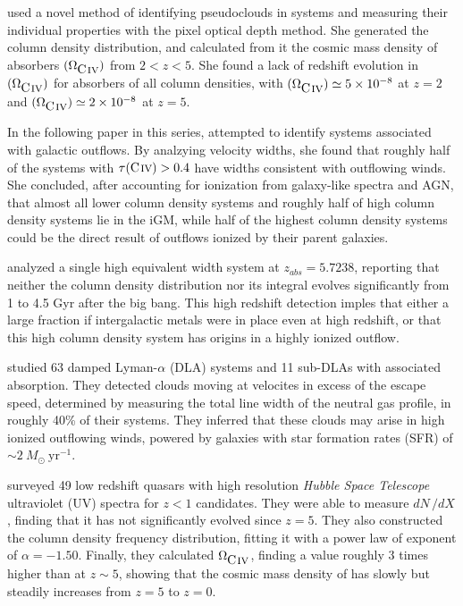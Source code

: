 \documentclass[linenumbers,twocolumn]{aastex61}
\begin{document}
\cite{Songaila2005} used a novel method of identifying pseudoclouds in {\CIVdblt} systems and measuring their individual properties with the pixel optical depth method. She generated the {\CIV} column density distribution, and calculated from it the cosmic mass density of {\CIV} absorbers $(\Omega_{\hbox{{\rm C}\kern 0.1em{\sc iv}}})$ from $2 < z < 5$. She found a lack of redshift evolution in $(\Omega_{\hbox{{\rm C}\kern 0.1em{\sc iv}}})$ for absorbers of all column densities, with $(\Omega_{\hbox{{\rm C}\kern 0.1em{\sc iv}}}) \simeq 5 \times 10^{-8}$ at $z = 2$ and $(\Omega_{\hbox{{\rm C}\kern 0.1em{\sc iv}}}) \simeq 2 \times 10^{-8}$ at $z = 5$. %

In the following paper in this series, \cite{Songaila2006} attempted to identify {\CIV} systems associated with galactic outflows. By analzying velocity widths, she found that roughly half of the systems with $\tau(\hbox{{\rm C}\kern 0.1em{\sc iv}}) > 0.4$ have widths consistent with outflowing winds. She concluded, after accounting for ionization from galaxy-like spectra and AGN, that almost all lower column density systems and roughly half of high column density {\CIV} systems lie in the iGM, while half of the highest column density systems could be the direct result of outflows ionized by their parent galaxies.

\cite{Ryan-Weber2006} analyzed a single high equivalent width {\CIV} system at $z_{abs} = 5.7238$, reporting that neither the column density distribution nor its integral evolves significantly from 1 to 4.5 Gyr after the big bang. This high redshift detection imples that either a large fraction if intergalactic metals were in place even at high redshift, or that this high column density system has origins in a highly ionized outflow.

\cite{Fox2007} studied 63 damped Lyman-$\alpha$ (DLA) systems and 11 sub-DLAs with associated {\CIV} absorption. They detected {\CIV} clouds moving at velocites in excess of the escape speed, determined by measuring the total line width of the neutral gas profile, in roughly 40\% of their systems. They inferred that these clouds may arise in high ionized outflowing winds, powered by galaxies with star formation rates (SFR) of $\sim 2~M_{\odot}~\mathrm{yr^{-1}}$.

\cite{Cooksey2010} surveyed 49 low redshift quasars with high resolution {\it Hubble Space Telescope} ultraviolet (UV) spectra for $z < 1$ {\CIV} candidates. They were able to measure $dN\,/dX$, finding that it has not significantly evolved since $z = 5$. They also constructed the column density frequency distribution, fitting it with a power law of exponent of $\alpha = -1.50$. Finally, they calculated $\Omega_{\hbox{{\rm C}\kern 0.1em{\sc iv}}}$, finding a value roughly 3 times higher than at $z \sim 5$, showing that the cosmic mass density of {\CIV} has slowly but steadily increases from $z = 5$ to $z = 0$.
\end{document}
